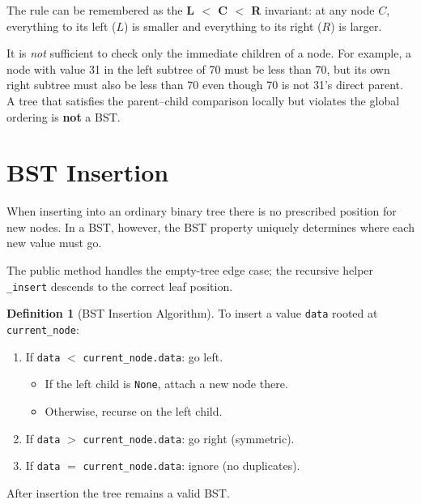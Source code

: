 \documentclass[11pt, a4paper, notitlepage]{report}
\theoremstyle{definition}
\newtheorem{definition}[theorem]{Definition}
\theoremstyle{remark}
\theoremstyle{definition}
\begin{document}
The rule can be remembered as the \textbf{L $<$ C $<$ R} invariant: at any node $C$, everything
to its left ($L$) is smaller and everything to its right ($R$) is larger.

\begin{warning}[title={Warning: Local vs.\ Global Ordering}]
It is \emph{not} sufficient to check only the immediate children of a node.  For example, a node
with value 31 in the left subtree of 70 must be less than 70, but its own right subtree must
also be less than 70 even though 70 is not 31's direct parent.  A tree that satisfies
the parent--child comparison locally but violates the global ordering is \textbf{not} a BST.
\end{warning}

\section{BST Insertion}
\label{sec:bst-insert}

When inserting into an ordinary binary tree there is no prescribed position for new nodes.  In
a BST, however, the BST property uniquely determines where each new value must go.

The public method handles the empty-tree edge case; the recursive helper \texttt{\_insert}
descends to the correct leaf position.

\begin{definition}[BST Insertion Algorithm]
\label{def:bst-insert}
To insert a value \texttt{data} rooted at \texttt{current\_node}:
\begin{enumerate}
  \item If \texttt{data} $<$ \texttt{current\_node.data}: go left.
    \begin{itemize}
      \item If the left child is \texttt{None}, attach a new node there.
      \item Otherwise, recurse on the left child.
    \end{itemize}
  \item If \texttt{data} $>$ \texttt{current\_node.data}: go right (symmetric).
  \item If \texttt{data} $=$ \texttt{current\_node.data}: ignore (no duplicates).
\end{enumerate}
After insertion the tree remains a valid BST.
\end{definition}
\end{document}
